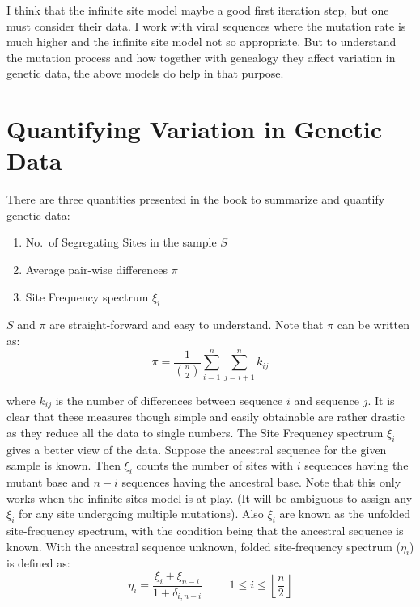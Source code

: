 \documentclass[
]{book}
\theoremstyle{definition}
\theoremstyle{definition}
\theoremstyle{definition}
\theoremstyle{definition}
\theoremstyle{remark}
\begin{document}
I think that the infinite site model maybe a good first iteration step, but one must consider their data. I work with viral sequences where the mutation rate is much higher and the infinite site model not so appropriate. But to understand the mutation process and how together with genealogy they affect variation in genetic data, the above models do help in that purpose.

\hypertarget{quantifying-variation-in-genetic-data}{%
\section{Quantifying Variation in Genetic Data}\label{quantifying-variation-in-genetic-data}}

There are three quantities presented in the book to summarize and quantify genetic data:

\begin{enumerate}
\def\labelenumi{\arabic{enumi}.}
\item
  No.~of Segregating Sites in the sample \(S\)
\item
  Average pair-wise differences \(\pi\)
\item
  Site Frequency spectrum \(\xi_i\)
\end{enumerate}

\(S\) and \(\pi\) are straight-forward and easy to understand. Note that \(\pi\) can be written as:
\[\pi = \frac{1}{{n \choose 2}}\sum_{i=1}^n \sum_{j=i+1}^n k_{ij}\]

where \(k_{ij}\) is the number of differences between sequence \(i\) and sequence \(j\).
It is clear that these measures though simple and easily obtainable are rather drastic as they reduce all the data to single numbers.
The Site Frequency spectrum \(\xi_i\) gives a better view of the data. Suppose the ancestral sequence for the given sample is known. Then \(\xi_i\) counts the number of sites with \(i\) sequences having the mutant base and \(n-i\) sequences having the ancestral base. Note that this only works when the infinite sites model is at play. (It will be ambiguous to assign any \(\xi_i\) for any site undergoing multiple mutations). Also \(\xi_i\) are known as the unfolded site-frequency spectrum, with the condition being that the ancestral sequence is known. With the ancestral sequence unknown, folded site-frequency spectrum (\(\eta_i\)) is defined as: \[\eta_i = \frac{\xi_i + \xi_{n-i}}{1+\delta_{i, n-i}} \hspace{1cm} 1\leq i \leq  \left \lfloor \frac{n}{2} \right \rfloor\]
\end{document}
